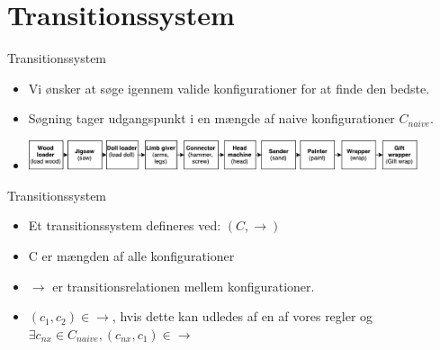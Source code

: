 \section{Transitionssystem}
\begin{frame}{Transitionssystem}{}
  \begin{itemize}
  \item<1-> Vi ønsker at søge igennem valide konfigurationer for at finde den bedste.
  \item<2-> Søgning tager udgangspunkt i en mængde af naive konfigurationer $C_{naive}$.
  \item<3->
  \includegraphics[width=0.9\textwidth]{figures/trivialexample.pdf}		    
    \end{itemize}
\end{frame}

\begin{frame}{Transitionssystem}{}
  \begin{itemize}
  \item<1-> Et transitionssystem defineres ved: $(C, \rightarrow)$
  \item<2-> C er mængden af alle konfigurationer
  \item<3-> $\rightarrow$ er transitionsrelationen mellem konfigurationer. 
  \item<4-> $(c_1,c_2) \in \rightarrow$, hvis dette kan udledes af en af vores regler og  $\exists c_{nx} \in C_{naive},  (c_{nx}, c_1) \in \rightarrow$
\end{itemize}    
\end{frame}
